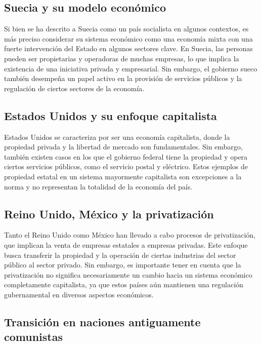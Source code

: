 \documentclass[
  man,
  floatsintext,
  longtable,
  a4paper,
  nolmodern,
  notxfonts,
  notimes,
  colorlinks=true,linkcolor=blue,citecolor=blue,urlcolor=blue]{apa7}
\begin{document}
\subsection{Suecia y su modelo
económico}\label{suecia-y-su-modelo-econuxf3mico}

Si bien se ha descrito a Suecia como un país socialista en algunos
contextos, es más preciso considerar su sistema económico como una
economía mixta con una fuerte intervención del Estado en algunos
sectores clave. En Suecia, las personas pueden ser propietarias y
operadoras de muchas empresas, lo que implica la existencia de una
iniciativa privada y empresarial. Sin embargo, el gobierno sueco también
desempeña un papel activo en la provisión de servicios públicos y la
regulación de ciertos sectores de la economía.

\subsection{Estados Unidos y su enfoque
capitalista}\label{estados-unidos-y-su-enfoque-capitalista}

Estados Unidos se caracteriza por ser una economía capitalista, donde la
propiedad privada y la libertad de mercado son fundamentales. Sin
embargo, también existen casos en los que el gobierno federal tiene la
propiedad y opera ciertos servicios públicos, como el servicio postal y
eléctrico. Estos ejemplos de propiedad estatal en un sistema mayormente
capitalista son excepciones a la norma y no representan la totalidad de
la economía del país.

\subsection{Reino Unido, México y la
privatización}\label{reino-unido-muxe9xico-y-la-privatizaciuxf3n}

Tanto el Reino Unido como México han llevado a cabo procesos de
privatización, que implican la venta de empresas estatales a empresas
privadas. Este enfoque busca transferir la propiedad y la operación de
ciertas industrias del sector público al sector privado. Sin embargo, es
importante tener en cuenta que la privatización no significa
necesariamente un cambio hacia un sistema económico completamente
capitalista, ya que estos países aún mantienen una regulación
gubernamental en diversos aspectos económicos.

\subsection{Transición en naciones antiguamente
comunistas}\label{transiciuxf3n-en-naciones-antiguamente-comunistas}
\end{document}
